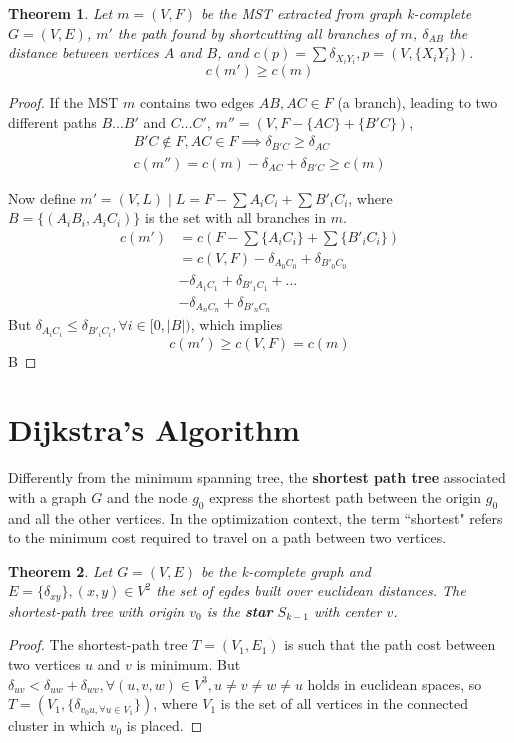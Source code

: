 \documentclass[journal]{IEEEtran}
\newtheorem{theorem}{Theorem}[section]
\begin{document}
\begin{theorem}
	Let $m=(V, F)$ be the MST extracted from graph k-complete $G=(V, E)$, $m'$ the path found by shortcutting all branches of $m$, $\delta_{AB}$ the distance between vertices $A$ and $B$, and $c(p)=\sum\delta_{X_iY_i}, p = (V, \{X_iY_i\})$.
	$$c(m') \ge c(m)$$
\end{theorem}
\begin{proof}
	If the MST $m$ contains two edges $AB, AC \in F$ (a branch), leading to two different paths $B...B'$ and $C\dots C'$, $m'' = (V, F-\{AC\}+\{B'C\})$,
    \begin{align*}
    B'C \notin F, AC \in F \implies \delta_{B'C} \ge \delta_{AC} \\
    c(m'') = c(m) - \delta_{AC} + \delta_{B'C} \ge c(m)
    \end{align*}
    
	Now define $m' = (V, L) \mid L = F - \sum {A_iC_i} + \sum {B'_iC_i}$, where $B = \{(A_iB_i, A_iC_i)\}$ is the set with all branches in $m$.
    \begin{align*}
    c(m') &= c(F - \sum \{A_iC_i\} + \sum \{B'_iC_i\}) \\
    &= c(V, F)  - \delta_{A_0C_0} + \delta_{B'_0C_0} \\
    &- \delta_{A_1C_1} + \delta_{B'_1C_1} + \dots \\
    &- \delta_{A_nC_n} + \delta_{B'_nC_n}
    \end{align*}
    But $\delta_{A_iC_i} \le \delta_{B'_iC_i}, \forall i\in [0, |B|)$, which implies
	$$c(m') \ge c(V, F) = c(m)$$B
\end{proof}

\section{Dijkstra's Algorithm}

Differently from the minimum spanning tree, the \textbf{shortest path tree} associated with a graph $G$ and the node $g_0$ express the shortest path between the origin $g_0$ and all the other vertices. In the optimization context, the term ``shortest" refers to the minimum cost required to travel on a path between two vertices.

\begin{theorem}
	\label{t:star}
	Let $G=(V, E)$ be the k-complete graph and $E=\{\delta_{xy}\}, (x, y) \in V^2$ the set of egdes built over euclidean distances. The shortest-path tree with origin $v_0$ is the \textbf{star} $S_{k-1}$ with center $v$.
\end{theorem}
\begin{proof}
	The shortest-path tree $T=(V_1, E_1)$ is such that the path cost between two vertices $u$ and $v$ is minimum. But $\delta_{uv} < \delta_{uw} + \delta_{wv}, \forall (u, v, w) \in V^3, u \ne v \ne w \ne u$ holds in euclidean spaces, so $T = (V_1, \{\delta_{v_0u, \forall u \in V_1}\})$, where $V_1$ is the set of all vertices in the connected cluster in which $v_0$ is placed.
\end{proof}
\end{document}
